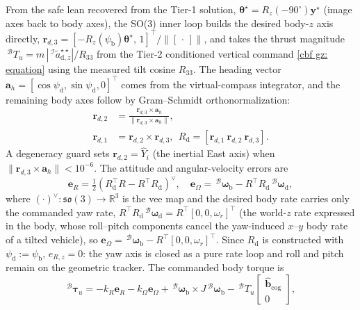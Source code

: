 \documentclass{IEEEtaes}
\theoremstyle{definition}
\theoremstyle{remark}
\begin{document}
From the safe lean recovered from the Tier-1 solution, $\boldsymbol{\theta}^\star=R_z(-90^\circ)\boldsymbol{y}^\star$ (image axes back to body axes), the SO(3) inner loop builds the desired body-$z$ axis directly, $\boldsymbol{r}_{d,3}=[-R_z(\psi_\text{b})\boldsymbol{\theta}^\star,\,1]^\top/\|[\,\cdot\,]\|$, and takes the thrust magnitude $\,^\mathcal{B}T_u=m\,|\,^\mathcal{I}\tilde{a}^{\star\star}_{\text{d},z}|/R_{33}$ from the Tier-2 conditioned vertical command \eqref{cbf gz: equation} using the measured tilt cosine $R_{33}$. The heading vector $\boldsymbol{a}_h=[\cos\psi_\text{d},\sin\psi_\text{d},0]^\top$ comes from the virtual-compass integrator, and the remaining body axes follow by Gram--Schmidt orthonormalization:
\begin{align} \label{R_d construction: equation}
    \boldsymbol{r}_{d,2} &= \frac{\boldsymbol{r}_{d,3}\times\boldsymbol{a}_h}{\|\boldsymbol{r}_{d,3}\times\boldsymbol{a}_h\|}, \nonumber\\
    \boldsymbol{r}_{d,1} &= \boldsymbol{r}_{d,2}\times\boldsymbol{r}_{d,3},\ \ R_\text{d}=[\boldsymbol{r}_{d,1}\ \boldsymbol{r}_{d,2}\ \boldsymbol{r}_{d,3}].
\end{align}
A degeneracy guard sets $\boldsymbol{r}_{d,2}=\hat{Y}_i$ (the inertial East axis) when $\|\boldsymbol{r}_{d,3}\times\boldsymbol{a}_h\|<10^{-6}$. The attitude and angular-velocity errors are
\begin{equation} \label{so3 errors: equation}
    \boldsymbol{e}_R = \tfrac12(R_\text{d}^\top R - R^\top R_\text{d})^\vee,\quad \boldsymbol{e}_\Omega = \,^\mathcal{B} \boldsymbol{\omega}_{\text{b}} - R^\top R_\text{d}\,^\mathcal{B}\boldsymbol{\omega}_\text{d},
\end{equation}
where $(\cdot)^\vee:\mathfrak{so}(3)\to\mathbb{R}^3$ is the vee map and the desired body rate carries only the commanded yaw rate, $R^\top R_\text{d}\,^\mathcal{B}\boldsymbol{\omega}_\text{d}=R^\top[0,0,\omega_r]^\top$ (the world-$z$ rate expressed in the body, whose roll--pitch components cancel the yaw-induced $x$--$y$ body rate of a tilted vehicle), so $\boldsymbol{e}_\Omega=\,^\mathcal{B}\boldsymbol{\omega}_\text{b}-R^\top[0,0,\omega_r]^\top$. Since $R_\text{d}$ is constructed with $\psi_\text{d}:=\psi_\text{b}$, $e_{R,z}=0$: the yaw axis is closed as a pure rate loop and roll and pitch remain on the geometric tracker. The commanded body torque is
\begin{equation} \label{so3 torque: equation}
    \,^\mathcal{B}\boldsymbol{\tau}_u = -k_R\boldsymbol{e}_R - k_\Omega\boldsymbol{e}_\Omega + \,^\mathcal{B} \boldsymbol{\omega}_{\text{b}}\times J\,^\mathcal{B} \boldsymbol{\omega}_{\text{b}} - \,^\mathcal{B}T_u\begin{bmatrix}\hat{\boldsymbol{b}}_\text{cog}\\ 0\end{bmatrix},
\end{equation}
\end{document}
